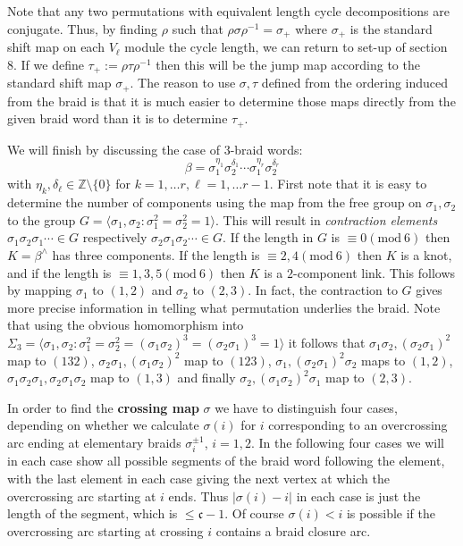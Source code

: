 \documentclass[11pt]{article}
\theoremstyle{definition}
\theoremstyle{remark}
\theoremstyle{remark}
\begin{document}
Note that any two permutations with equivalent length cycle decompositions are conjugate. Thus, by finding $\rho $ such that
$\rho \sigma \rho^{-1}=\sigma_+$ where $\sigma_+$ is the standard shift map on each $V_{\ell }$ module the cycle length, 
we can return to set-up of section 8. If we define $\tau_+:=\rho \tau \rho^{-1}$ then this will be the jump map according to the standard shift map $\sigma_+$. The reason to use $\sigma ,\tau $ defined from the ordering induced from the braid is that 
it is much easier to determine those maps directly from the given braid word than it is to determine $\tau_+$.

We will finish by discussing the case of $3$-braid words:
$$\beta =\sigma_1^{\eta _1}\sigma_2^{\delta_1}\cdots \sigma_1^{\eta_r}\sigma_2^{\delta_r}$$
with $\eta_k, \delta_{\ell}\in \mathbb{Z}\setminus \{0\}$ for $k=1,\ldots r, \ell =1,\ldots r-1$. First note that it is easy to determine the number of components using the map from the free group on $\sigma_1,\sigma_2$ to the group $G=\langle \sigma_1,\sigma_2:\sigma_1^2=\sigma_2^2=1\rangle $. This will result in \textit{contraction elements} $\sigma_1\sigma_2\sigma_1\cdots \in G$ respectively $\sigma_2\sigma_1\sigma_2\cdots \in G$. If the length in $G$ is $\equiv 0(\textrm{mod}\ 6)$ then 
$K=\beta ^{\wedge}$ has three components. If the length is $\equiv 2,4(\textrm{mod}\ 6)$ then $K$ is a knot, and if the length is $\equiv 1,3,5(\textrm{mod}\ 6)$ then $K$ is a $2$-component link. This follows by mapping $\sigma_1$ to $(1,2)$ and $\sigma_2$ to $(2,3)$. In fact, the contraction to $G$ gives more precise information in telling what permutation underlies the braid. Note that using the obvious homomorphism into $\Sigma_3=\langle \sigma_1,\sigma_2:\sigma_1^2=\sigma_2^2=(\sigma_1\sigma_2)^3=(\sigma_2\sigma_1)^3=1\rangle $ it follows that 
$\sigma_1\sigma_2, (\sigma_2\sigma_1)^2$ map to $(132)$, $\sigma_2\sigma_1, (\sigma_1\sigma_2)^2$ map to 
$(123)$, $\sigma_1, (\sigma_2\sigma_1)^2\sigma_2$ maps to $(1,2)$, $\sigma_1\sigma_2\sigma_1, \sigma_2\sigma_1\sigma_2$ map to $(1,3)$ and finally $\sigma_2, (\sigma_1\sigma_2)^2\sigma_1$ map to $(2,3)$.

\vskip 0.2in

In order to find the \textbf{crossing map} $\sigma $ we have to distinguish four cases, depending on whether we calculate $\sigma (i)$ for $i$ corresponding to an overcrossing arc ending at elementary braids $\sigma_i^{\pm 1}$, $i=1,2$. 
In the following four cases we will in each case show all possible segments of the braid word following the element, with the last element in each case giving the next vertex at which the overcrossing arc starting at $i$ ends. Thus $|\sigma (i)-i|$ in each case is just the length of the segment, which is $\leq \mathfrak{c}-1$. Of course $\sigma (i)<i$ is possible if the overcrossing arc starting at crossing $i$ contains a braid closure arc. 
\end{document}
